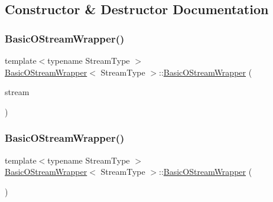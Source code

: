 \subsection{Constructor \& Destructor Documentation}
\mbox{\label{classBasicOStreamWrapper_a067a516c13b7c9d4dacef598d32779ef}} 
\subsubsection{\texorpdfstring{Basic\+O\+Stream\+Wrapper()}{BasicOStreamWrapper()}\hspace{0.1cm}{\footnotesize\ttfamily [1/2]}}
{\footnotesize\ttfamily template$<$typename Stream\+Type $>$ \\
\hyperlink{classBasicOStreamWrapper}{Basic\+O\+Stream\+Wrapper}$<$ Stream\+Type $>$\+::\hyperlink{classBasicOStreamWrapper}{Basic\+O\+Stream\+Wrapper} (\begin{DoxyParamCaption}\item[{Stream\+Type \&}]{stream }\end{DoxyParamCaption})\hspace{0.3cm}{\ttfamily [inline]}}

\mbox{\label{classBasicOStreamWrapper_a3afe69cbc61a45e824392ca9b691c063}} 
\subsubsection{\texorpdfstring{Basic\+O\+Stream\+Wrapper()}{BasicOStreamWrapper()}\hspace{0.1cm}{\footnotesize\ttfamily [2/2]}}
{\footnotesize\ttfamily template$<$typename Stream\+Type $>$ \\
\hyperlink{classBasicOStreamWrapper}{Basic\+O\+Stream\+Wrapper}$<$ Stream\+Type $>$\+::\hyperlink{classBasicOStreamWrapper}{Basic\+O\+Stream\+Wrapper} (\begin{DoxyParamCaption}\item[{const \hyperlink{classBasicOStreamWrapper}{Basic\+O\+Stream\+Wrapper}$<$ Stream\+Type $>$ \&}]{ }\end{DoxyParamCaption})\hspace{0.3cm}{\ttfamily [private]}}



